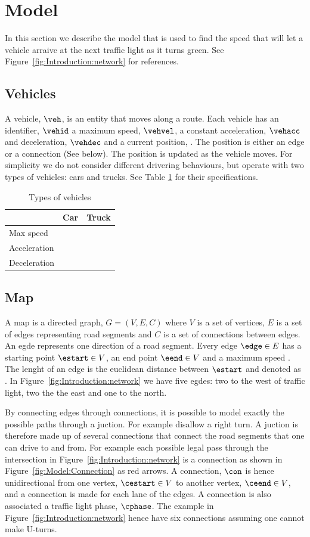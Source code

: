 \section{Model}\label{sec:Model}
In this section we describe the model that is used to find the speed that will let a vehicle arraive at the next traffic light as it turns green.
See Figure~\ref{fig:Introduction:network} for references.

\subsection{Vehicles}
A vehicle, $\veh$, is an entity that moves along a route.
Each vehicle has an identifier, $\vehid$ a maximum speed, $\vehvel$, a constant acceleration, $\vehacc$ and deceleration, $\vehdec$ and a current position, \vehpos. 
The position is either an edge or a connection (See below).
The position is updated as the vehicle moves.
For simplicity we do not consider different drivering behaviours, but operate with two types of vehicles: cars and trucks. See Table \ref{table.vehicleTypes} for their specifications.
\begin{table}
\centering
\begin{tabular}{|l|l|l|}\hline
		& Car 	& Truck \\\hline
Max speed 	& 	& \\\hline
Acceleration 	&	& \\\hline
Deceleration 	&	& \\\hline
\end{tabular}
\caption{Types of vehicles}\label{table.vehicleTypes}
\end{table}

\subsection{Map}
A map is a directed graph, $G = (V, E, C)$ where $V$ is a set of vertices, $E$ is a set of edges representing road segments and $C$ is a set of connections between edges.
An egde represents one direction of a road segment.
Every edge $\edge\in E$ has a starting point $\estart\in V$, an end point $\eend\in V$ and a maximum speed \espeed. 
The lenght of an edge is the euclidean distance between $\estart$ and \eend denoted as \elength.
In Figure~\ref{fig:Introduction:network} we have five egdes: two to the west of traffic light, two the the east and one to the north. %

By connecting edges through connections, it is possible to model exactly the possible paths through a juction. 
For example disallow a right turn.
A juction is therefore made up of several connections that connect the road segments that one can drive to and from.
For example each possible legal pass through the intersection in Figure~\ref{fig:Introduction:network} is a connection as shown in Figure~\ref{fig:Model:Connection} as red arrows. 
A connection, $\con$ is hence unidirectional from one vertex, $\cestart\in V$ to another vertex, $\ceend \in V$, and a connection is made for each lane of the edges.
A connection is also associated a traffic light phase, $\cphase$. 
The example in Figure~\ref{fig:Introduction:network} hence have six connections assuming one cannot make U-turns.

